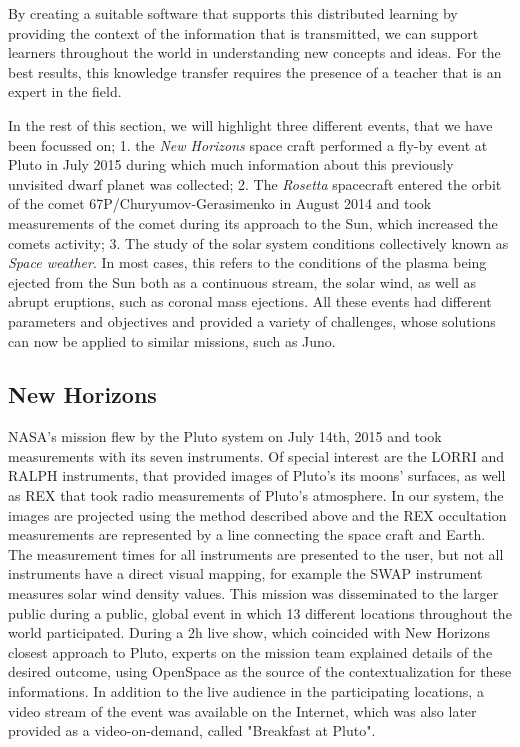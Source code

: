 \documentclass{vgtc}                %
\begin{document}
By creating a suitable software that supports this distributed learning by providing the context of the information that is transmitted, we can support learners throughout the world in understanding new concepts and ideas. For the best results, this knowledge transfer requires the presence of a teacher that is an expert in the field.

In the rest of this section, we will highlight three different events, that we have been focussed on; 1. the \emph{New Horizons} space craft performed a fly-by event at Pluto in July 2015 during which much information about this previously unvisited dwarf planet was collected; 2. The \emph{Rosetta} spacecraft entered the orbit of the comet 67P/Churyumov-Gerasimenko in August 2014 and took measurements of the comet during its approach to the Sun, which increased the comets activity; 3. The study of the solar system conditions collectively known as \emph{Space weather}. In most cases, this refers to the conditions of the plasma being ejected from the Sun both as a continuous stream, the solar wind, as well as abrupt eruptions, such as coronal mass ejections. All these events had different parameters and objectives and provided a variety of challenges, whose solutions can now be applied to similar missions, such as Juno.

\subsection*{New Horizons}
NASA's mission flew by the Pluto system on July 14th, 2015 and took measurements with its seven instruments. Of special interest are the LORRI and RALPH instruments, that provided images of Pluto's its moons' surfaces, as well as REX that took radio measurements of Pluto's atmosphere. In our system, the images are projected using the method described above and the REX occultation measurements are represented by a line connecting the space craft and Earth. The measurement times for all instruments are presented to the user, but not all instruments have a direct visual mapping, for example the SWAP instrument measures solar wind density values. This mission was disseminated to the larger public during a public, global event in which 13 different locations throughout the world participated. During a 2h live show, which coincided with New Horizons closest approach to Pluto, experts on the mission team explained details of the desired outcome, using OpenSpace as the source of the contextualization for these informations. In addition to the live audience in the participating locations, a video stream of the event was available on the Internet, which was also later provided as a video-on-demand, called "Breakfast at Pluto".
\end{document}
